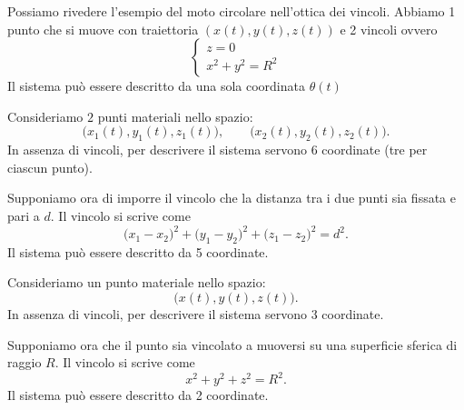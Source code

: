 \begin{example}{}
    Possiamo rivedere l'esempio del moto circolare nell'ottica dei vincoli. Abbiamo 1 punto che si muove con traiettoria $(x(t) , y(t) , z(t))$ e 2 vincoli ovvero
    \[
    \begin{cases}
        z = 0 \\
        x^2 + y^2 = R^2
    \end{cases}
    \]
    Il sistema può essere descritto da una sola coordinata $\theta(t)$
\end{example}

\begin{example}{}
Consideriamo $2$ punti materiali nello spazio:
\[
\bigl(x_1(t),y_1(t),z_1(t)\bigr), \qquad \bigl(x_2(t),y_2(t),z_2(t)\bigr).
\]
In assenza di vincoli, per descrivere il sistema servono $6$ coordinate (tre per ciascun punto).

Supponiamo ora di imporre il vincolo che la distanza tra i due punti sia fissata e pari a $d$. Il vincolo si scrive come
\[
\bigl(x_1-x_2\bigr)^2+\bigl(y_1-y_2\bigr)^2+\bigl(z_1-z_2\bigr)^2=d^2.
\]
Il sistema può essere descritto da 5 coordinate.
\end{example}

\begin{example}{}
Consideriamo un punto materiale nello spazio:
\[
\bigl(x(t),y(t),z(t)\bigr).
\]
In assenza di vincoli, per descrivere il sistema servono $3$ coordinate.

Supponiamo ora che il punto sia vincolato a muoversi su una superficie sferica di raggio $R$. Il vincolo si scrive come
\[
x^2+y^2+z^2=R^2.
\]
Il sistema può essere descritto da 2 coordinate.
\end{example}

